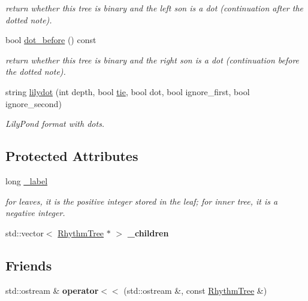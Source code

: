\begin{DoxyCompactItemize}
\begin{DoxyCompactList}\small\item\em return whether this tree is binary and the left son is a dot (continuation after the dotted note). \end{DoxyCompactList}\item 
bool \mbox{\hyperlink{group__output_ga2079bd534900d0b10e74682e404230b1}{dot\+\_\+before}} () const
\begin{DoxyCompactList}\small\item\em return whether this tree is binary and the right son is a dot (continuation before the dotted note). \end{DoxyCompactList}\item 
string \mbox{\hyperlink{group__output_ga89f5bf140b902f886be124d620ac8474}{lilydot}} (int depth, bool \mbox{\hyperlink{group__output_ga3933e83072d4e7c3bb3d19d25df90b47}{tie}}, bool dot, bool ignore\+\_\+first, bool ignore\+\_\+second)
\begin{DoxyCompactList}\small\item\em Lily\+Pond format with dots. \end{DoxyCompactList}\end{DoxyCompactItemize}
\subsection*{Protected Attributes}
\begin{DoxyCompactItemize}
\item 
long \mbox{\hyperlink{classRhythmTree_a172a0c68e4b6adace9c025c9159040e2}{\+\_\+label}}
\begin{DoxyCompactList}\small\item\em for leaves, it is the positive integer stored in the leaf; for inner tree, it is a negative integer. \end{DoxyCompactList}\item 
\mbox{\label{classRhythmTree_ac11078e58a8ca630953768bc6dc4d74e}} 
std\+::vector$<$ \mbox{\hyperlink{classRhythmTree}{Rhythm\+Tree}} $\ast$ $>$ {\bfseries \+\_\+children}
\end{DoxyCompactItemize}
\subsection*{Friends}
\begin{DoxyCompactItemize}
\item 
\mbox{\label{classRhythmTree_abf182cfbb8d6fd109d144104344199e2}} 
std\+::ostream \& {\bfseries operator$<$$<$} (std\+::ostream \&, const \mbox{\hyperlink{classRhythmTree}{Rhythm\+Tree}} \&)
\end{DoxyCompactItemize}


